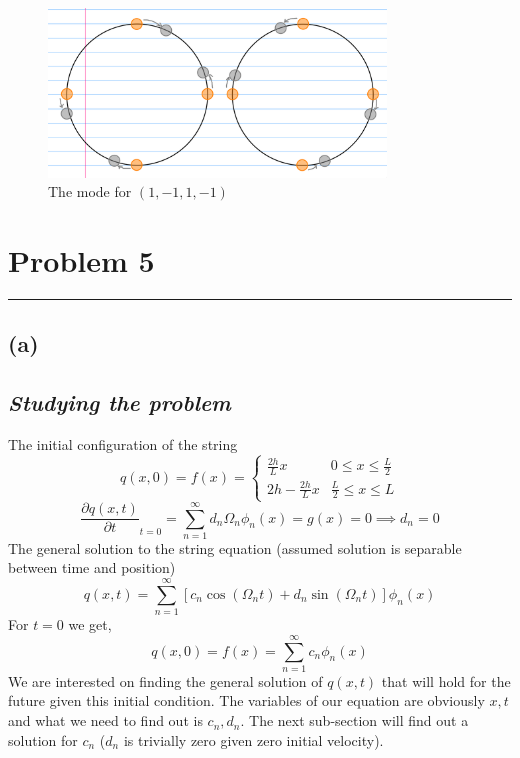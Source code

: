 \documentclass[letter, 10pts]{article}
\begin{document}
\begin{figure}[H]
	\centering
	\includegraphics[width=0.8\textwidth]{./ss/11/4.png}
	\caption{The mode for $(1,-1,1,-1)$}
	\label{fig:-ss-11-4-png}
\end{figure}




















\newpage 
\section*{Problem 5}
\hrule 




\subsection*{(a)}
\subsection*{\emph{Studying the problem}}
The initial configuration of the string 
\[
q(x,0) = f(x) = 
\begin{cases}
	\frac{2h}{L}x & 0 \le x \le \frac{L}{2} \\
	2h - \frac{2h}{L}x & \frac{L}{2} \le  x \le  L 
\end{cases}
\]
\[
	\frac{\partial q(x,t)}{\partial t} _{t=0} = \sum_{n=1}^{\infty} d_n \Omega_n \phi_n(x) = g(x) = 0 \implies \boxed{
	d_n = 0
	} 
\] 
The general solution to the string equation (assumed solution is separable between time and position)
\[
	q(x,t) = \sum_{n=1}^{\infty} [c_n \cos(\Omega_n t) + d_n \sin(\Omega_n t) ] \phi_n(x)
\]
For $t = 0$ we get, 
\[
	q(x,0) = f(x) = \sum_{n=1}^{\infty} c_n \phi_n(x)\] 
We are interested on finding the general solution of $q(x,t)$ that will hold for the future given this initial condition. The variables of our equation are obviously $x,t$ and what we need to find out is $c_n, d_n$. The next sub-section will find out a solution for $c_n$ ($d_n$ is trivially zero given zero initial velocity).
\end{document}

